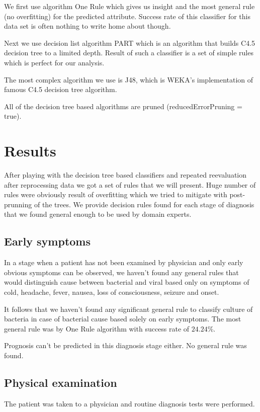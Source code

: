 \documentclass[11pt]{article}
\begin{document}
We first use algorithm One Rule which gives us insight and the most general
rule (no overfitting) for the predicted attribute. Success rate of this
classifier for this data set is often nothing to write home about though.

Next we use decision list algorithm PART\cite{Frank1998}\cite{weka_PART} which
is an algorithm that builds C4.5 decision tree to a limited depth. Result of
such a classifier is a set of simple rules which is perfect for our analysis.

The most complex algorithm we use is J48, which is WEKA's implementation of
famous C4.5 decision tree algorithm.

All of the decision tree based algorithms are pruned (reducedErrorPruning =
true).



\section{Results}
After playing with the decision tree based classifiers and repeated
reevaluation after reprocessing data we got a set of rules that we will
present. Huge number of rules were obviously result of overfitting which we
tried to mitigate with post-prunning of the trees. We provide decision rules
found for each stage of diagnosis that we found general enough to be used by
domain experts.

\subsection{Early symptoms}
In a stage when a patient has not been examined by physician and only early
obvious symptoms can be observed, we haven't found any general rules that would
distinguish cause between bacterial and viral based only on symptoms of cold,
headache, fever, nausea, loss of consciousness, seizure and onset.

It follows that we haven't found any significant general rule to classify
culture of bacteria in case of bacterial cause based solely on early symptoms.
The most general rule was by One Rule algorithm with success rate of $24.24\%$.

Prognosis can't be predicted in this diagnosis stage either. No general rule
was found.

\subsection{Physical examination}
The patient was taken to a physician and routine diagnosis tests were
performed.
\end{document}
